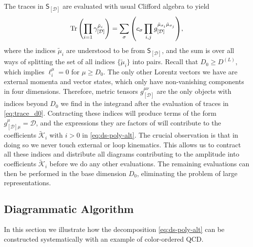 The traces in $\mathsf{S}_{[\mathcal{D}]}$ are evaluated with usual Clifford algebra to yield
\begin{equation} \label{eq:trace_d0}
  \Tr\qty(\prod_{i=1} \gamma_{[\mathcal{D}]}^{\tilde{\mu}_i}) =  \sum_\sigma \qty( c_\sigma \prod_{i,j} g_{[\mathcal{D}]}^{\tilde{\mu}_{\sigma_i}\tilde{\mu}_{\sigma_j}}),
\end{equation}
where the indices  $\tilde{\mu}_i$ are understood to be from $\mathsf{S}_{[\mathcal{D}]}$, and the sum is over all ways
of splitting the set of all indices $\{\tilde{\mu}_i\}$ into pairs.
Recall that $D_0\geq D^{(L)}$, which implies $\ell_i^\mu = 0$ for $\mu\geq D_0$.
The only other Lorentz vectors we have are external momenta and vector states, which only have non-vanishing components
in four dimensions. 
Therefore, metric tensors $g^{\mu\nu}_{[\mathcal{D}]}$ are the only objects with indices beyond $D_0$ we find
in the integrand after the evaluation of traces in  \cref{eq:trace_d0}.
Contracting these indices will produce terms of the form $g^\mu_{[\mathcal{D}]\mu} = \mathcal{D}$, 
and the expressions they are factors of will contribute to the coefficients $\tilde{\mathcal{K}}_i$ with $i>0$ in \cref{eq:ds-poly-alt}. 
The crucial observation is that in doing so we never touch external or loop kinematics.
This allows us to contract all these indices and distribute 
all diagrams contributing to the amplitude into coefficients $\tilde{\mathcal{K}}_i$ before
we do any other evaluations.
The remaining evaluations can then be performed in the base dimension $D_0$,
eliminating the problem of large representations.

\subsection{Diagrammatic Algorithm}
\label{sec:DsFeynRules}

In this section we illustrate how the decomposition \cref{eq:ds-poly-alt} can
be constructed systematically with an example of color-ordered QCD.

